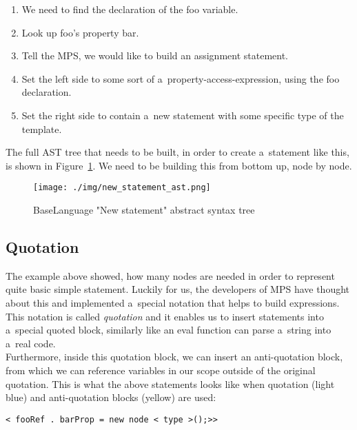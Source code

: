 \begin{enumerate}
	\item We need to find the declaration of the foo variable.
	\item Look up foo's property bar.
	\item Tell the MPS, we would like to build an assignment statement.
	\item Set the left side to some sort of a~property-access-expression, using the foo declaration.
	\item Set the right side to contain a~new statement with some specific type of the template.
\end{enumerate}

The full AST tree that needs to be built, in order to create a~statement like this, is shown in Figure~\ref{fig:new_ast}.
We need to be building this from bottom up, node by node.

\begin{figure}[ht]
	\centering
	\hspace*{-18mm}
	\texttt{[image: ./img/new\_statement\_ast.png]}
	\caption{BaseLanguage "New statement" abstract syntax tree}
	\label{fig:new_ast}
\end{figure}

\subsection{Quotation}
The example above showed, how many nodes are needed in order to represent quite basic simple statement.
Luckily for us, the developers of MPS have thought about this and implemented a~special notation that helps to build expressions.
This notation is called \textit{quotation} and it enables us to insert statements into a~special quoted block, similarly like an eval function can parse a~string into a~real code.
\\

Furthermore, inside this quotation block, we can insert an anti-quotation block, from which we can reference variables in our scope outside of the original quotation.
This is what the above statements looks like when quotation (light blue) and anti-quotation blocks (yellow) are used:

\begin{center}
	\texttt{\colorbox{cyan!30}{<}\lexerrule{\%(} fooRef \lexerrule{)\%}.\lexerrule{\%(} barProp \lexerrule{)\%} = new node <\lexerrule{\textasciicircum(} type \lexerrule{)\textasciicircum}>();>\colorbox{cyan!30}{>}}
\end{center}

